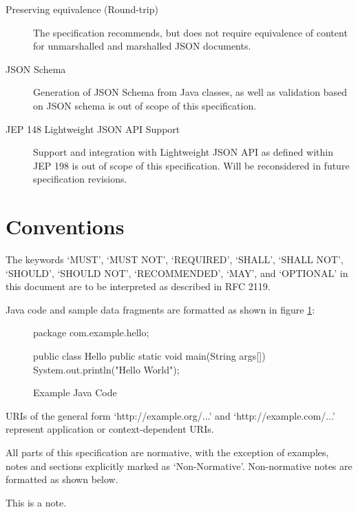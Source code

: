 \begin{description}

\item[Preserving equivalence (Round-trip)] The specification recommends, but does not require equivalence of content for unmarshalled and marshalled JSON documents.

\item[JSON Schema] Generation of JSON Schema from Java classes, as well as validation based on JSON schema is out of scope of this specification.

\item[JEP 148 Lightweight JSON API Support] Support and integration with Lightweight JSON API as defined within JEP 198 is out of scope of this specification. Will be reconsidered in future specification revisions.

\end{description}

\section{Conventions}

The keywords `MUST', `MUST NOT', `REQUIRED', `SHALL', `SHALL NOT', `SHOULD', `SHOULD NOT', `RECOMMENDED', `MAY', and `OPTIONAL' in this document are to be interpreted as described in RFC 2119\cite{rfc2119}. 

Java code and sample data fragments are formatted as shown in figure \ref{ex1}:

\begin{figure}[hbtp]
\caption{Example Java Code}
\label{ex1}
\begin{listing}{1}
package com.example.hello;

public class Hello {
    public static void main(String args[]) {
        System.out.println("Hello World");
    }
}\end{listing}
\end{figure}

URIs of the general form `http://example.org/...' and `http://example.com/...' represent application or context-dependent URIs.

All parts of this specification are normative, with the exception of examples, notes and sections explicitly marked as `Non-Normative'. Non-normative notes are formatted as shown below.

\begin{nnnote*}
This is a note.
\end{nnnote*}

